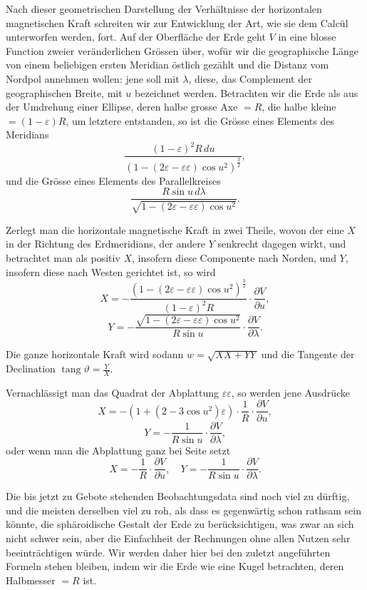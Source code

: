 \documentclass[fontsize=11pt,paper=a4,twoside,openany]{scrbook}
\DeclareMathOperator{\tang}{tang}
\begin{document}
Nach dieser geometrischen Darstellung der Verhältnisse der horizontalen magnetischen Kraft schreiten wir zur Entwicklung der Art, wie sie dem Calcül unterworfen werden, fort. Auf der Oberfläche der Erde geht $V$ in eine blosse Function zweier veränderlichen Grössen über, wofür wir die geographische Länge von einem beliebigen ersten Meridian östlich gezählt und die Distanz vom Nordpol annehmen wollen: jene soll mit $\lambda$, diese, das Complement der geographischen Breite, mit $u$ bezeichnet werden. Betrachten wir die Erde als aus der Umdrehung einer Ellipse, deren halbe grosse Axe $=R$, die halbe kleine $=(1-\varepsilon)R$, um letztere entstanden, so ist die Grösse eines Elements des Meridians
\[
\frac{(1-\varepsilon)^2 R\,du}{(1-(2\varepsilon-\varepsilon\varepsilon)\cos u^2)^{\frac{3}{2}}},
\]
und die Grösse eines Elements des Parallelkreises
\[
\frac{R\sin u\,d\lambda}{\sqrt{1-(2\varepsilon-\varepsilon\varepsilon)\cos u^2}}.
\]

Zerlegt man die horizontale magnetische Kraft in zwei Theile, wovon der eine $X$ in der Richtung des Erdmeridians, der andere $Y$ senkrecht dagegen wirkt, und betrachtet man als positiv $X$, insofern diese Componente nach Norden, und $Y$, insofern diese nach Westen gerichtet ist, so wird
\[
X = -\frac{(1-(2\varepsilon-\varepsilon\varepsilon)\cos u^2)^{\frac{3}{2}}}{(1-\varepsilon)^2 R}\cdot\frac{\partial V}{\partial u},
\]
\[
Y = -\frac{\sqrt{1-(2\varepsilon-\varepsilon\varepsilon)\cos u^2}}{R\sin u}\cdot\frac{\partial V}{\partial \lambda}.
\]

Die ganze horizontale Kraft wird sodann $w=\sqrt{XX+YY}$ und die Tangente der Declination $\tang\vartheta=\frac{Y}{X}$.

Vernachlässigt man das Quadrat der Abplattung $\varepsilon\varepsilon$, so werden jene Ausdrücke
\[
X = -(1+(2-3\cos u^2)\varepsilon)\cdot\frac{1}{R}\cdot\frac{\partial V}{\partial u},
\]
\[
Y = -\frac{1}{R\sin u}\cdot\frac{\partial V}{\partial \lambda},
\]
oder wenn man die Abplattung ganz bei Seite setzt
\[
X = -\frac{1}{R}\cdot\frac{\partial V}{\partial u},\quad Y = -\frac{1}{R\sin u}\cdot\frac{\partial V}{\partial \lambda}.
\]

Die bis jetzt zu Gebote stehenden Beobachtungsdata sind noch viel zu dürftig, und die meisten derselben viel zu roh, als dass es gegenwärtig schon rathsam sein könnte, die sphäroidische Gestalt der Erde zu berücksichtigen, was zwar an sich nicht schwer sein, aber die Einfachheit der Rechnungen ohne allen Nutzen sehr beeinträchtigen würde. Wir werden daher hier bei den zuletzt angeführten Formeln stehen bleiben, indem wir die Erde wie eine Kugel betrachten, deren Halbmesser $=R$ ist.
\end{document}
